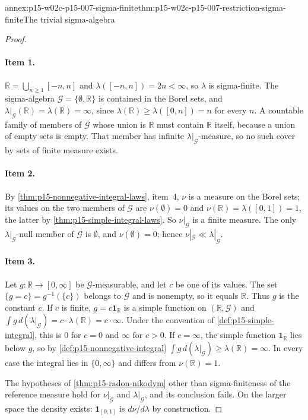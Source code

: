 \begin{annexitem}{annex:p15-w02c-p15-007-sigma-finite}{thm:p15-w02c-p15-007-restriction-sigma-finite}{The trivial sigma-algebra}
\begin{proof}
\paragraph{Item 1.}
\(\mathbb R=\bigcup_{n\geq1}[-n,n]\) and \(\lambda([-n,n])=2n<\infty\), so
\(\lambda\) is sigma-finite. The sigma-algebra
\(\mathcal G=\{\emptyset,\mathbb R\}\) is contained in the Borel sets, and
\(\lambda|_{\mathcal G}(\mathbb R)=\lambda(\mathbb R)=\infty\), since
\(\lambda(\mathbb R)\geq\lambda([0,n])=n\) for every \(n\). A countable
family of members of \(\mathcal G\) whose union is \(\mathbb R\) must
contain \(\mathbb R\) itself, because a union of empty sets is empty.
That member has infinite \(\lambda|_{\mathcal G}\)-measure, so no such
cover by sets of finite measure exists.

\paragraph{Item 2.}
By \cref{thm:p15-nonnegative-integral-laws}, item~4, \(\nu\) is a measure on
the Borel sets; its values on the two members of \(\mathcal G\) are
\(\nu(\emptyset)=0\) and \(\nu(\mathbb R)=\lambda([0,1])=1\), the latter by
\cref{thm:p15-simple-integral-laws}. So \(\nu|_{\mathcal G}\) is a finite
measure. The only \(\lambda|_{\mathcal G}\)-null member of \(\mathcal G\)
is \(\emptyset\), and \(\nu(\emptyset)=0\); hence
\(\nu|_{\mathcal G}\ll\lambda|_{\mathcal G}\).

\paragraph{Item 3.}
Let \(g:\mathbb R\to[0,\infty]\) be \(\mathcal G\)-measurable, and let
\(c\) be one of its values. The set \(\{g=c\}=g^{-1}(\{c\})\) belongs to
\(\mathcal G\) and is nonempty, so it equals \(\mathbb R\). Thus \(g\) is
the constant \(c\). If \(c\) is finite, \(g=c\mathbf1_{\mathbb R}\) is a
simple function on \((\mathbb R,\mathcal G)\) and
\(\int g\,d(\lambda|_{\mathcal G})=c\cdot\lambda(\mathbb R)=c\cdot\infty\).
Under the convention of \cref{def:p15-simple-integral}, this is \(0\) for
\(c=0\) and \(\infty\) for \(c>0\). If \(c=\infty\), the simple function
\(\mathbf1_{\mathbb R}\) lies below \(g\), so by
\cref{def:p15-nonnegative-integral}
\(\int g\,d(\lambda|_{\mathcal G})\geq\lambda(\mathbb R)=\infty\). In every
case the integral lies in \(\{0,\infty\}\) and differs from
\(\nu(\mathbb R)=1\).

The hypotheses of \cref{thm:p15-radon-nikodym} other than
sigma-finiteness of the reference measure hold for
\(\nu|_{\mathcal G}\) and \(\lambda|_{\mathcal G}\), and its conclusion
fails. On the larger space the density exists: \(\mathbf1_{[0,1]}\) is
\(d\nu/d\lambda\) by construction.
\end{proof}
\end{annexitem}
